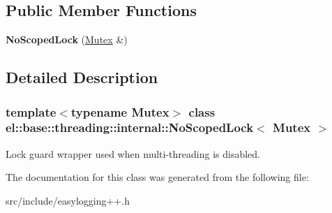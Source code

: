 \subsection*{Public Member Functions}
\begin{DoxyCompactItemize}
\item 
\mbox{\label{classel_1_1base_1_1threading_1_1internal_1_1_no_scoped_lock_a020f8cea6e83f40ea29662ef57a58235}} 
{\bfseries No\+Scoped\+Lock} (\hyperlink{classel_1_1base_1_1threading_1_1internal_1_1_no_mutex}{Mutex} \&)
\end{DoxyCompactItemize}


\subsection{Detailed Description}
\subsubsection*{template$<$typename Mutex$>$\newline
class el\+::base\+::threading\+::internal\+::\+No\+Scoped\+Lock$<$ Mutex $>$}

Lock guard wrapper used when multi-\/threading is disabled. 

The documentation for this class was generated from the following file\+:\begin{DoxyCompactItemize}
\item 
src/include/easylogging++.\+h\end{DoxyCompactItemize}
